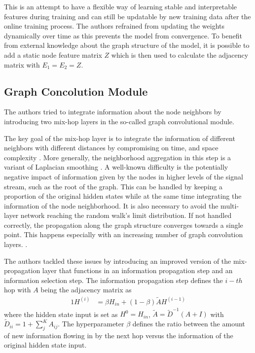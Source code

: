 \documentclass[letterpaper, twocolumn,11pt]{article}
\begin{document}
    This is an attempt to have a flexible way of learning stable and interpretable features during training and can still be updatable by new training data after the online training process.
    The authors refrained from updating the weights dynamically over time as this prevents the model from convergence.
    To benefit from external knowledge about the graph structure of the model, it is possible to add a static node feature matrix $Z$
    which is then used to calculate the adjacency matrix with $E_1 =  E_2 = Z $.

    \subsection{Graph Concolution Module}
    The authors tried to integrate information about the node neighbors by introducing two mix-hop layers in the so-called graph convolutional module.

    The key goal of the mix-hop layer is to integrate the information of different neighbors with different distances by compromising on time, and space complexity \cite{AbuElHaija}.
    More generally, the neighborhood aggregation in this step is a variant of Laplacian smoothing \cite{leskovec2005graphs}.
    A well-known difficulty is the potentially negative impact of information given by the nodes in higher levels of the signal stream, such as the root of the graph.
    This can be handled by keeping a proportion of the original hidden states while at the same time integrating the information
    of the node neighborhood.
    It is also necessary to avoid the multi-layer network reaching the random walk's limit distribution.
    If not handled correctly, the propagation along the graph structure converges towards a single point. This happens especially with an increasing number of graph convolution layers. \cite{klicpera2018predict}.

    The authors tackled these issues by introducing an improved version of the mix-propagation layer that functions in an
    information propagation step and an information selection step.
    The information propagation step defines the $i-th$ hop with $A$ being the adjacency matrix as
    \begin{alignat}{1}
        H^{(i)} &= \beta H_{in} + (1-\beta) \tilde{A} H^{(i-1)} \label{eq:hop}
    \end{alignat}
    where the hidden state input is set as $H^0 = H_{in}$, $\tilde{A} = \tilde{D}^{-1}(A +I)$ with $\tilde{D}_{ii}=1 + \sum_{j}^{K}A_{ij}$.
    The hyperparameter $\beta$ defines the ratio between the amount of new information flowing in by the next hop versus the information of the original hidden state input.
\end{document}
